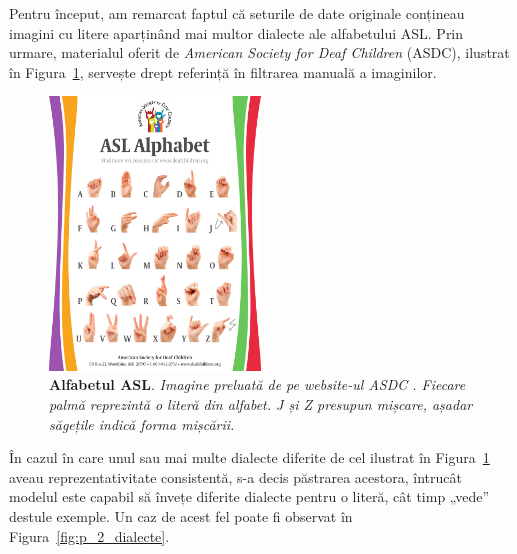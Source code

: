 Pentru început, am remarcat faptul că seturile de date originale conțineau imagini cu litere aparținând mai multor dialecte ale alfabetului ASL. Prin urmare, materialul oferit de \textit{American Society for Deaf Children} (ASDC), ilustrat în Figura~\ref{fig:exemplu_litere_fingerspell}, servește drept referință în filtrarea manuală a imaginilor.

\begin{figure}[H]
  \centering
  \includegraphics[width=0.5\textwidth]{images/2-recunoasterea-asl/ASL-Alphabet-ASDC.pdf}
  \caption[Alfabetul ASL]{\textbf{Alfabetul ASL}. \textit{Imagine preluată de pe website-ul ASDC \cite{asl_alphabet_chart}. Fiecare palmă reprezintă o literă din alfabet. J și Z presupun mișcare, așadar săgețile indică forma mișcării.}}
  \label{fig:exemplu_litere_fingerspell}
\end{figure}

În cazul în care unul sau mai multe dialecte diferite de cel ilustrat în Figura~\ref{fig:exemplu_litere_fingerspell} aveau reprezentativitate consistentă, s-a decis păstrarea acestora, întrucât modelul este capabil să învețe diferite dialecte pentru o literă, cât timp „vede” destule exemple. Un caz de acest fel poate fi observat în Figura~\ref{fig:p_2_dialecte}.

